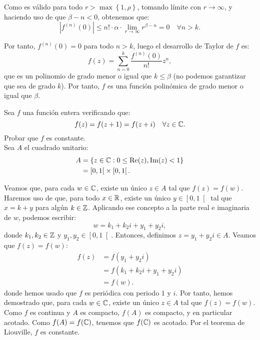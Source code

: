 \begin{ejercicio}
    Como es válido para todo $r> \max \left\{1,\rho \right\}$, tomando límite con $r\to \infty$, y haciendo uso de que $\beta-n<0$, obtenemos que:
    \begin{equation*}
        |f^{(n)}(0)| \leq n!\cdot \alpha \cdot \lim_{r\to \infty} r^{\beta-n}=0 \quad \forall n>k.
    \end{equation*}

    Por tanto, $f^{(n)}(0)=0$ para todo $n>k$, luego el desarrollo de Taylor de $f$ es:
    \begin{equation*}
        f(z)=\sum_{n=0}^{k} \dfrac{f^{(n)}(0)}{n!} z^n,
    \end{equation*}
    que es un polinomio de grado menor o igual que $k\leq \beta$ (no podemos garantizar que sea de grado $k$). Por tanto, $f$ es una función polinómica de grado menor o igual que $\beta$.
\end{ejercicio}

\begin{ejercicio}
    Sea $f$ una función entera verificando que:
    \begin{equation*}
        f(z)=f(z+1)=f(z+i) \quad \forall z\in \mathbb{C}.
    \end{equation*}
    Probar que $f$ es constante.\\

    Sea $A$ el cuadrado unitario:
    \begin{align*}
        A &= \left\{ z\in \mathbb{C} : 0\leq \operatorname{Re}(z),\operatorname{Im}(z)<1 \right\} \\
        &= \left[0,1\right[ \times \left[0,1\right[.
    \end{align*}

    Veamos que, para cada $w\in \mathbb{C}$, existe un único $z\in A$ tal que $f(z)=f(w)$. Haremos uso de que, para todo $x\in \mathbb{R}$, existe un único $y\in \left[0,1\right[$ tal que $x=k+y$ para algún $k\in \mathbb{Z}$. Aplicando ese concepto a la parte real e imaginaria de $w$, podemos escribir:
    \begin{equation*}
        w=k_1 + k_2 i + y_1 + y_2 i,
    \end{equation*}
    donde $k_1,k_2\in \mathbb{Z}$ y $y_1,y_2\in \left[0,1\right[$. Entonces, definimos $z=y_1 + y_2 i\in A$. Veamos que $f(z)=f(w)$:
    \begin{align*}
        f(z) &= f(y_1 + y_2 i) \\
        &= f(k_1 + k_2 i + y_1 + y_2 i) \\
        &= f(w).
    \end{align*}
    donde hemos usado que $f$ es periódica con periodo $1$ y $i$. Por tanto, hemos demostrado que, para cada $w\in \mathbb{C}$, existe un único $z\in A$ tal que $f(z)=f(w)$.\\

    Como $f$ es continua y $A$ es compacto, $f(A)$ es compacto, y en particular acotado. Como $f(A)=f(\mathbb{C})$, tenemos que $f(\mathbb{C})$ es acotado. Por el teorema de Liouville, $f$ es constante.
\end{ejercicio}


